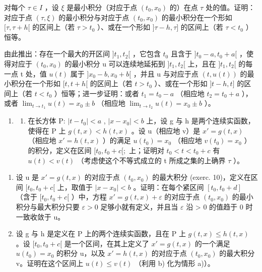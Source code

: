 对每个 \(\tau \in I\) ，设 \(\xi\) 是最小积分（对应于点 \((t_0, x_0)\) 的）在点 \(\tau\) 处的值。证明：对应于点 \((\tau, \xi)\) 的最小积分与对应于点 \((t_0, x_0)\) 的最小积分在一个形如 \([\tau, \tau + h[\) 的区间上（若 \(\tau > t_0\) ）、或在一个形如 \(]\tau - h, \tau]\) 的区间上（若 \(\tau < t_0\) ）恒等。

由此推出：存在一个最大的开区间 \(]t_{1}, t_{2}[\) ，它包含 \(t_{0}\) 且含于 \(]t_{0}-a, t_{0}+a[\) ，使得对应于 \((t_{0}, x_{0})\) 的最小积分 u 可以连续地延拓到 \(]t_{1}, t_{2}[\) 上，且在 \(]t_{1}, t_{2}[\) 的每一点 t 处，值 \(u(t)\) 属于 \(]x_{0}-b, x_{0}+b[\) ，并且 u 与对应于点 \((t, u(t))\) 的最小积分在一个形如 \([t, t+h[\) 的区间上（若 \(t > t_{0}\) ）、或在一个形如 \(]t-h, t]\) 的区间上（若 \(t < t_{0}\) ）恒等；进一步证明：或者 \(t_{1} = t_{0} - a\) （相应地 \(t_{2} = t_{0} + a\) ），或者 \(\lim_{t \to t_{1}} u(t) = x_{0} \pm b\) （相应地 \(\lim_{t \to t_{2}} u(t) = x_{0} \pm b\) ）。

\begin{enumerate}
\def\labelenumi{\arabic{enumi})}
\setcounter{enumi}{10}
\tightlist
\item
  \begin{enumerate}
  \def\labelenumii{\alph{enumii})}
  \tightlist
  \item
    在长方体 P: \(|t - t_{0}| < a\) , \(|x - x_{0}| < b\) 上，设 g 与 h 是两个连续实函数，使得在 P 上 \(g(t, x) < h(t, x)\) 。设 u（相应地 v）是 \(x' = g(t, x)\) （相应地 \(x' = h(t, x)\) ）的满足 \(u(t_{0}) = x_{0}\) （相应地 \(v(t_{0}) = x_{0}\) ）的积分，定义在区间 \([t_{0}, t_{0} + c[;\) 上；证明对 \(t_{0} < t < t_{0} + c\) 有 \(u(t) < v(t)\) （考虑使这个不等式成立的 t 所成之集的上确界 \(\tau\) ）。
  \end{enumerate}
\end{enumerate}

\begin{enumerate}
\def\labelenumi{\alph{enumi})}
\setcounter{enumi}{1}
\item
  设 u 是 \(x' = g(t, x)\) 的对应于点 \((t_0, x_0)\) 的最大积分 (exerc. 10)，定义在区间 \([t_0, t_0 + c[\) 上，取值于 \(|x - x_0| < b\) 。证明：在每个紧区间 \([t_0, t_0 + d]\) （含于 \([t_0, t_0 + c[\) ）中，方程 \(x' = g(t, x) + \varepsilon\) 的对应于点 \((t_0, x_0)\) 的最小积分与最大积分只要 \(\varepsilon > 0\) 足够小就有定义，并且当 \(\varepsilon\) 沿 \textgreater{} 0 的值趋于 0 时一致收敛于 u。
\item
  设 g 与 h 是定义在 P 上的两个连续实函数，且在 P 上 \(g(t, x) \leqslant h(t, x)\) 。设 \([t_0, t_0 + c[\) 是一个区间，在其上定义了 \(x' = g(t, x)\) 的一个满足 \(u(t_0) = x_0\) 的积分 u，以及 \(x' = h(t, x)\) 的对应于点 \((t_0, x_0)\) 的最大积分 v。证明在这个区间上 \(u(t) \leqslant v(t)\) （利用 b) 化为情形 a)）。
\end{enumerate}

